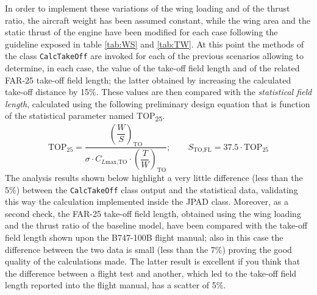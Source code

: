 %
\noindent
In order to implement these variations of the wing loading and of the thrust ratio, the aircraft weight has been assumed constant, while the wing area and the static thrust of the engine have been modified for each case following the guideline exposed in table \ref{tab:WS} and \ref{tab:TW}.
%
\noindent
At this point the methods of the class \lstinline[language=Java]!CalcTakeOff! are invoked for each of the previous scenarios allowing to determine, in each case, the value of the take-off field length and of the related \gls{FAR}-25 take-off field length; the latter obtained by increasing the calculated take-off distance by 15\%. These values are then compared with the \emph{statistical field length}, calculated using the following preliminary design equation that is function of the statistical parameter named TOP\textsubscript{25}.
%
\begin{equation}
\text{TOP}_{25}=\dfrac{\left(\dfrac{W}{S}\right)_{\text{TO}}}{\sigma\cdot C_{L\text{max,TO}}\cdot\left(\dfrac{T}{W}\right)_{\text{TO}}}; \qquad S_{\text{TO,FL}}=37.5\cdot \text{TOP}_{25}
\end{equation}
%
The analysis results shown below highlight a very little difference (less than the 5\%) between the \lstinline[language=Java]!CalcTakeOff! class output and the statistical data, validating this way the calculation implemented inside the \gls{JPAD} class. Moreover, as a second check, the \gls{FAR}-25 take-off field length, obtained using the wing loading and the thrust ratio of the baseline model, have been compared with the take-off field length shown upon the B747-100B flight manual; also in this case the difference between the two data is small (less than the 7\%) proving the good quality of the calculations made. The latter result is excellent if you think that the difference between a flight test and another, which led to the take-off field length reported into the flight manual, has a scatter of 5\%.  

